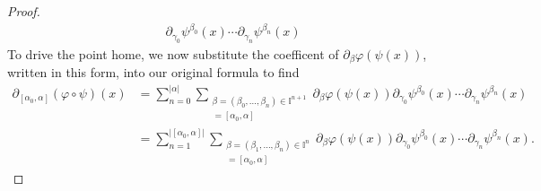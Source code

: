 \documentclass[12pt]{amsart}
\begin{document}
\begin{proof}
\begin{align*}
  \partial_{\gamma_0}\psi^{\beta_0}(x)
  \cdots
  \partial_{\gamma_n}\psi^{\beta_n}(x)
\end{align*}
To drive the point home, we now substitute the coefficent of
$\partial_{\beta} \varphi(\psi(x))$, written in this form,
into our original formula to find
\begin{align*}
  \partial_{[\alpha_0,\alpha]}( \varphi \circ \psi)(x) &= \sum_{n=0}^{|\alpha |} \sum_{
    \substack{
      \beta = (\beta_0,\dots,\beta_n) \in \mathbb{I}^{n+1}\\
      [\gamma_0,\dots,\gamma_n] = [\alpha_0,\alpha]      
      }
    }\partial_{\beta}\varphi(\psi(x)) \partial_{\gamma_0}\psi^{\beta_0}(x) \cdots \partial_{\gamma_n}\psi^{\beta_n}(x) \\
  &=\sum_{n=1}^{|[\alpha_0,\alpha] |} \sum_{
    \substack{
      \beta = (\beta_1,\dots,\beta_n) \in \mathbb{I}^{n}\\
      [\gamma_1,\dots,\gamma_n] = [\alpha_0,\alpha]      
      }
    }\partial_{\beta}\varphi(\psi(x)) \partial_{\gamma_0}\psi^{\beta_0}(x) \cdots \partial_{\gamma_n}\psi^{\beta_n}(x).
\end{align*}

\end{proof}



\end{document}
